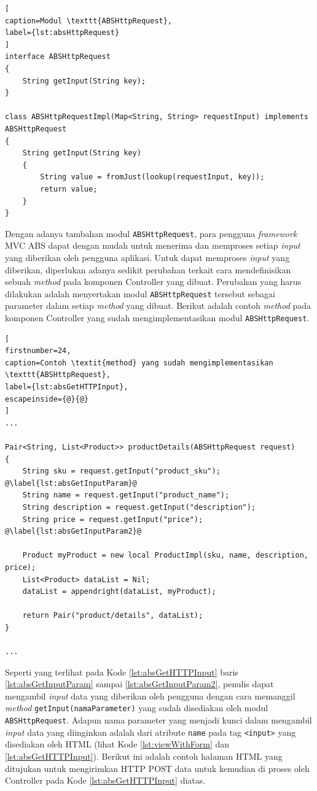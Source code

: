\begin{lstlisting}[
caption=Modul \texttt{ABSHttpRequest},
label={lst:absHttpRequest}
]
interface ABSHttpRequest
{
	String getInput(String key);
}

class ABSHttpRequestImpl(Map<String, String> requestInput) implements ABSHttpRequest
{
	String getInput(String key)
	{
		String value = fromJust(lookup(requestInput, key));
		return value;
	}
}
\end{lstlisting}

Dengan adanya tambahan modul \texttt{ABSHttpRequest}, para pengguna \textit{framework} MVC ABS dapat dengan mudah untuk menerima dan memproses setiap \textit{input} yang diberikan oleh pengguna aplikasi. Untuk dapat memproses \textit{input} yang diberikan, diperlukan adanya sedikit perubahan terkait cara mendefinisikan sebuah \textit{method} pada komponen Controller yang dibuat. Perubahan yang harus dilakukan adalah menyertakan modul \texttt{ABSHttpRequest} tersebut sebagai parameter dalam setiap \textit{method} yang dibuat. Berikut adalah contoh \textit{method} pada komponen Controller yang sudah mengimplementasikan modul \texttt{ABSHttpRequest}.

\begin{lstlisting}[
firstnumber=24,
caption=Contoh \textit{method} yang sudah mengimplementasikan \texttt{ABSHttpRequest},
label={lst:absGetHTTPInput},
escapeinside={@}{@}
]
...

Pair<String, List<Product>> productDetails(ABSHttpRequest request)
{
	String sku = request.getInput("product_sku"); @\label{lst:absGetInputParam}@
	String name = request.getInput("product_name");
	String description = request.getInput("description");
	String price = request.getInput("price"); @\label{lst:absGetInputParam2}@
	
	Product myProduct = new local ProductImpl(sku, name, description, price);
	List<Product> dataList = Nil;
	dataList = appendright(dataList, myProduct);
	
	return Pair("product/details", dataList);
}

...
\end{lstlisting}

Seperti yang terlihat pada Kode \ref{lst:absGetHTTPInput} baris \ref{lst:absGetInputParam} sampai \ref{lst:absGetInputParam2}, penulis dapat mengambil \textit{input} data yang diberikan oleh pengguna dengan cara memanggil \textit{method} \texttt{getInput(namaParameter)} yang sudah disediakan oleh modul \texttt{ABSHttpRequest}. Adapun nama parameter yang menjadi kunci dalam mengambil \textit{input} data yang diinginkan adalah dari atribute \texttt{name} pada tag \texttt{<input>} yang disediakan oleh HTML (lihat Kode \ref{lst:viewWithForm} dan \ref{lst:absGetHTTPInput}). Berikut ini adalah contoh halaman HTML yang ditujukan untuk mengirimkan HTTP POST data untuk kemudian di proses oleh Controller pada Kode \ref{lst:absGetHTTPInput} diatas.

